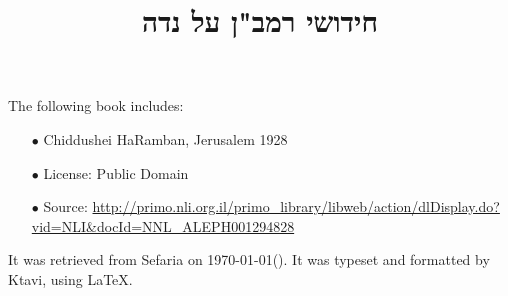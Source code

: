 \documentclass[12pt, openany]{book}
\newcommand{\texttitle}{חידושי רמב"ן על נדה}\usepackage{titlesec}
\begin{document}
\frontmatter
{}

\title{\texttitle}

\author{}

\date{}

\maketitle

\begin{minipage}[b][\textheight][b]{\textwidth}\englishfont	
	\begin{english}
		\vfill
		The following book includes:
\begin{itemize}
\item[$\bullet$] Chiddushei HaRamban, Jerusalem 1928
\item[$\bullet$] License: Public Domain
\item[$\bullet$] Source: \url{http://primo.nli.org.il/primo_library/libweb/action/dlDisplay.do?vid=NLI&docId=NNL_ALEPH001294828}
\end{itemize}
		It was retrieved from Sefaria on \today\space \texthebrew{(\Hebrewtoday)}.  It was typeset and formatted by Ktavi, using \LaTeX .
		\clearpage
		
	\end{english}
\end{minipage}


\tableofcontents

\clearpage
\mainmatter
{}
\end{document}
